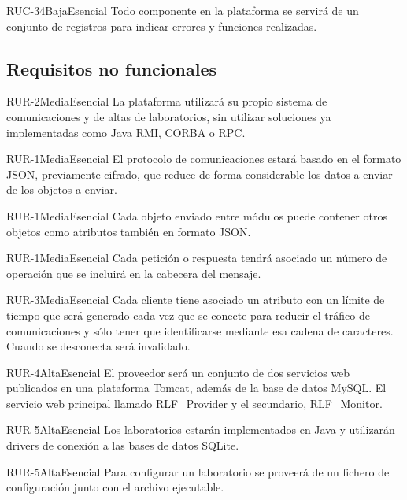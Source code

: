 {RUC-34}{Baja}{Esencial}
{
Todo componente en la plataforma se servirá de un conjunto de 
registros para indicar errores y funciones realizadas.
}

\subsection{Requisitos no funcionales}

{RUR-2}{Media}{Esencial}
{
La plataforma utilizará su propio sistema de comunicaciones y de altas 
de laboratorios, sin utilizar soluciones ya implementadas como Java 
RMI, CORBA o RPC.
}

{RUR-1}{Media}{Esencial}
{
El protocolo de comunicaciones estará basado en el formato JSON, 
previamente cifrado, que reduce de forma considerable los datos a 
enviar de los objetos a enviar.
}

{RUR-1}{Media}{Esencial}
{
Cada objeto enviado entre módulos puede contener otros objetos como 
atributos también en formato JSON.
}

{RUR-1}{Media}{Esencial}
{
Cada petición o respuesta tendrá asociado un número de operación 
que se incluirá en la cabecera del mensaje.
} 

{RUR-3}{Media}{Esencial}
{
Cada cliente tiene asociado un atributo con un límite de tiempo que 
será generado cada vez que se conecte para reducir el tráfico de 
comunicaciones y sólo tener que identificarse mediante esa cadena de 
caracteres. Cuando se desconecta será invalidado.
} 

{RUR-4}{Alta}{Esencial}
{
El proveedor será un conjunto de dos servicios web publicados en una 
plataforma Tomcat, además de la base de datos MySQL. El servicio web 
principal llamado RLF\_Provider y el secundario, RLF\_Monitor.
} 

{RUR-5}{Alta}{Esencial}
{
Los laboratorios estarán implementados en Java y utilizarán drivers 
de conexión a las bases de datos SQLite.
}

{RUR-5}{Alta}{Esencial}
{
Para configurar un laboratorio se proveerá de un fichero de 
configuración junto con el archivo ejecutable.
}

